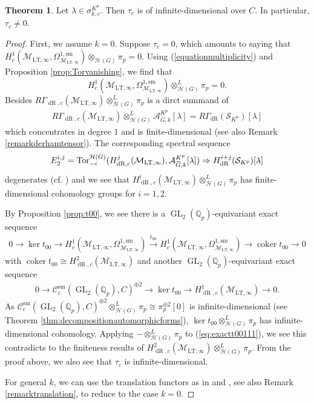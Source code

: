 \documentclass{article}
\theoremstyle{definition}
\newtheorem{theorem}{Theorem}[section]
\def\calA{\mathcal{A}}
\def\calC{\mathcal{C}}
\def\calH{\mathcal{H}}
\def\calM{\mathcal{M}}
\def\calS{\mathcal{S}}
\def\bbQ{\mathbb{Q}}
\DeclareMathOperator{\ox}{\otimes}
\def\isom{\cong}
\DeclareMathOperator{\coker}{coker}
\DeclareMathOperator{\GL}{GL}
\DeclareMathOperator{\dR}{dR}
\def\LT{\mathrm{LT}}
\def\sm{\mathrm{sm}}
\def\bar{\overline}
\def\ov{\stackrel}
\begin{document}
\begin{theorem}\label{thm:nonvanishingoftildetau}
Let $\lambda\in \sigma_{k,c}^{K^p}$. Then ${\tau_c }$ is of infinite-dimensional over $C$. In particular, ${\tau_c }\neq 0$. 
\end{theorem}
\begin{proof}
First, we assume $k=0$. Suppose $\tau_c = 0$, which amounts to saying that $H^1_c(\calM_{\LT,\infty},\Omega_{\calM_{\LT,\infty}}^{1,\sm})\ox_{\calH(G)}\pi_p=0$. Using (\ref{equationmultiplicity}) and Proposition \ref{prop:Torvanishing}, we find that 
\[H^1_c(\calM_{\LT,\infty},\Omega_{\calM_{\LT,\infty}}^{1,\sm})\ox_{\calH(G)}^L \pi_p=0.\] 
Besides $R\Gamma_{\dR,c}(\calM_{\LT,\infty})\ox^L_{\calH(G)}\pi_p$ is a dirct summand of 
\begin{align}\label{eq:fff}
    R\Gamma_{\dR,c}(\calM_{\LT,\infty})\ox^L_{\calH(G)}\calA_{\bar G,k}^{K^p}[\lambda]=R\Gamma_{\dR}(\calS_{K^p})[\lambda]
\end{align}
which concentrates in degree $1$ and is finite-dimensional (see also Remark \ref{remarkderhamtensor}). The corresponding spectral sequence \cite[\href{https://stacks.math.columbia.edu/tag/0662}{Tag 0662}]{stacks-project}
\[E_2^{i,j}=\mathrm{Tor}_{-i}^{\calH(G)}(H^j_{\rm dR,c}(\calM_{\LT,\infty}),\calA_{\bar G,k}^{K^p}[\lambda])\Rightarrow H^{i+j}_{\dR}(\calS_{K^p})[\lambda]\]
degenerates (cf. \cite[IV.4]{bernstein1992notes}) and we see that $H_{\dR,c}^i(\calM_{\LT,\infty})\otimes^L_{\calH(G)}\pi_p$ has finite-dimensional cohomology groups for $i=1,2$. 

By Proposition \ref{prop:t00}, we see there is a $\GL_2(\bbQ_p)$-equivariant exact sequence 
\begin{align}\label{eq:exactt00111}
    0\to \ker t_{00}\to H^1_c(\calM_{\LT,\infty},\Omega_{\calM_{\LT,\infty}}^{1,\sm})\ov{t_{00}}\to H^1_c(\calM_{\LT,\infty},\Omega_{\calM_{\LT,\infty}}^{1,\sm})\to \coker t_{00}\to 0
\end{align}
with $\coker t_{00}\isom H^2_{\dR,c}(\calM_{\LT,\infty})$ and another $\GL_2(\bbQ_p)$-equivariant exact sequence
\begin{align*}
    0\to \calC^\sm_c(\GL_2(\bbQ_p),C)^{\oplus 2}\to \ker t_{00}\to H^1_{\dR,c}(\calM_{\LT,\infty})\to 0.
\end{align*}
As $\calC^\sm_c(\GL_2(\bbQ_p),C)^{\oplus 2}\ox_{\calH(G)}^L \pi_p\isom \pi_p^{\oplus 2}[0]$ is infinite-dimensional (see Theorem \ref{thm:decompositionautomorphicforms}), $\ker t_{00}\otimes^L_{\calH(G)}\pi_p$ has infinite-dimensional cohomology. Applying $-\otimes^L_{\calH(G)}\pi_p$ to (\ref{eq:exactt00111}), we see this contradicts to the finiteness results of $ H_{\dR,c}^2(\calM_{\LT,\infty})\otimes^L_{\calH(G)}\pi_p$. From the proof above, we also see that $\tau_c $ is infinite-dimensional.

For general $k$, we can use the translation functors as in \cite[\S 2.2]{su2025locallyanalytictextext1conjecturetextgl2l} and \cite[Theorem 3.2.1]{JLS22}, see also Remark \ref{remarktranslation}, to reduce to the case $k=0$. 
\end{proof}
\end{document}
